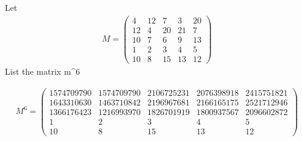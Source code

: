 \documentclass[10pt,letterpaper, cm]{hmcpset}
\begin{document}
  \begin{problem}
    Let
    \begin{align*}
      M = \begin{pmatrix}
        4 & 12 & 7 & 3 & 20 \\
        12 & 4 & 20 & 21 & 7  \\
        10 & 7 & 6 & 9 & 13 \\
        1 & 2 & 3 & 4 & 5 \\
        10 & 8 & 15 & 13 & 12
      \end{pmatrix}
    \end{align*}
    List the matrix m^6
  \end{problem}
    
  \begin{align*}
      M^6 = \begin{pmatrix}
        1574709790 &  1574709790 & 2106725231 & 2076398918 & 2415751821 \\
        1643310630 & 1463710842 & 2196967681 & 2166165175 & 2521712946  \\
        1366176423 & 1216993970 & 1826701919 & 1800937567 & 2096602872 \\
        1 & 2 & 3 & 4 & 5 \\
        10 & 8 & 15 & 13 & 12
      \end{pmatrix}
    \end{align*}
  
  
\end{document}
